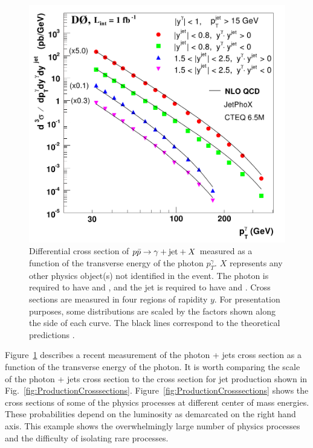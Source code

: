\begin{figure}[htbm]
 \centering
 \includegraphics[scale=0.45,keepaspectratio=true]{./PhoJets_Crosssection.png}
 \caption{Differential cross section of $p\bar{p}\to\gamma+\mathrm{jet}+X$ measured as a function of the transverse energy of the photon $p_{T}^{\gamma}$. $X$ represents any other physics object(s) not identified in the event. The photon is required to have  and , and the jet is required to have  and . Cross sections are measured in four regions of rapidity $y$. For presentation purposes, some distributions are scaled by the factors shown along the side of each curve. The black lines correspond to the theoretical predictions
 \cite{pap:PhoJetCrosssection_D0}.}
 \label{fig:PhoJetCrosssection}
\end{figure}
\vspace{-0.02\textheight}

Figure~\ref{fig:PhoJetCrosssection} describes a recent measurement of the photon + jets cross section as a function of the transverse energy of the photon. It is worth comparing the scale of the photon + jets cross section to the cross section for jet production shown in Fig.~\ref{fig:ProductionCrosssections}. Figure~\ref{fig:ProductionCrosssections} shows the cross sections of some of the physics processes at different center of mass energies. These probabilities depend on the luminosity as demarcated on the right hand axis. This example shows the overwhelmingly large number of physics processes and the difficulty of isolating rare processes.

